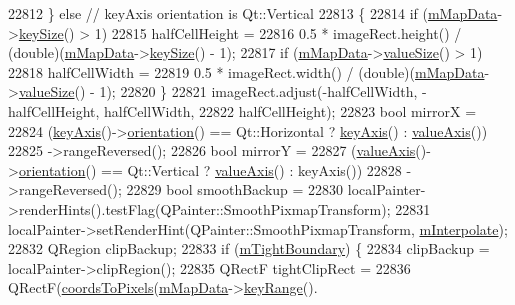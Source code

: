 \begin{DoxyCode}
22812   \} \textcolor{keywordflow}{else} \textcolor{comment}{// keyAxis orientation is Qt::Vertical}
22813   \{
22814     \textcolor{keywordflow}{if} (\hyperlink{class_q_c_p_color_map_a8709272aa8f0be3ca111bf3866806f8b}{mMapData}->\hyperlink{class_q_c_p_color_map_data_aa8d7811686fdfea964947715210c4af8}{keySize}() > 1)
22815       halfCellHeight =
22816           0.5 * imageRect.height() / (double)(\hyperlink{class_q_c_p_color_map_a8709272aa8f0be3ca111bf3866806f8b}{mMapData}->\hyperlink{class_q_c_p_color_map_data_aa8d7811686fdfea964947715210c4af8}{keySize}() - 1);
22817     \textcolor{keywordflow}{if} (\hyperlink{class_q_c_p_color_map_a8709272aa8f0be3ca111bf3866806f8b}{mMapData}->\hyperlink{class_q_c_p_color_map_data_ab880be6bc587f34e8d22fe77ef6b57e9}{valueSize}() > 1)
22818       halfCellWidth =
22819           0.5 * imageRect.width() / (double)(\hyperlink{class_q_c_p_color_map_a8709272aa8f0be3ca111bf3866806f8b}{mMapData}->\hyperlink{class_q_c_p_color_map_data_ab880be6bc587f34e8d22fe77ef6b57e9}{valueSize}() - 1);
22820   \}
22821   imageRect.adjust(-halfCellWidth, -halfCellHeight, halfCellWidth,
22822                    halfCellHeight);
22823   \textcolor{keywordtype}{bool} mirrorX =
22824       (\hyperlink{class_q_c_p_abstract_plottable_a72c7a09c22963f2c943f07112b311103}{keyAxis}()->\hyperlink{class_q_c_p_axis_a57483f2f60145ddc9e63f3af53959265}{orientation}() == Qt::Horizontal ? \hyperlink{class_q_c_p_abstract_plottable_a72c7a09c22963f2c943f07112b311103}{keyAxis}() : 
      \hyperlink{class_q_c_p_abstract_plottable_a3106f9d34d330a6097a8ec5905e5b519}{valueAxis}())
22825           ->rangeReversed();
22826   \textcolor{keywordtype}{bool} mirrorY =
22827       (\hyperlink{class_q_c_p_abstract_plottable_a3106f9d34d330a6097a8ec5905e5b519}{valueAxis}()->\hyperlink{class_q_c_p_axis_a57483f2f60145ddc9e63f3af53959265}{orientation}() == Qt::Vertical ? 
      \hyperlink{class_q_c_p_abstract_plottable_a3106f9d34d330a6097a8ec5905e5b519}{valueAxis}() : keyAxis())
22828           ->rangeReversed();
22829   \textcolor{keywordtype}{bool} smoothBackup =
22830       localPainter->renderHints().testFlag(QPainter::SmoothPixmapTransform);
22831   localPainter->setRenderHint(QPainter::SmoothPixmapTransform, \hyperlink{class_q_c_p_color_map_af77e5eba9a844592648edeb6fbe834f1}{mInterpolate});
22832   QRegion clipBackup;
22833   \textcolor{keywordflow}{if} (\hyperlink{class_q_c_p_color_map_ac2e9425fe4381b496726e1c09f978302}{mTightBoundary}) \{
22834     clipBackup = localPainter->clipRegion();
22835     QRectF tightClipRect =
22836         QRectF(\hyperlink{class_q_c_p_abstract_plottable_ade710a776104b14c1c835168ce1bfc5c}{coordsToPixels}(\hyperlink{class_q_c_p_color_map_a8709272aa8f0be3ca111bf3866806f8b}{mMapData}->\hyperlink{class_q_c_p_color_map_data_a4765180639742460f64ab6c97c745c08}{keyRange}().

\end{DoxyCode}

